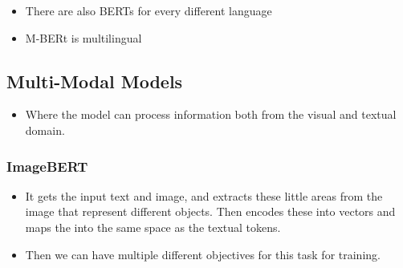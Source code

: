 \documentclass[11pt]{article}
\begin{document}
\begin{minipage}[l]{.5\linewidth}
    \begin{figure}[H]
        \centering
    \end{figure}    
\end{minipage}\hfill
\begin{minipage}[r]{.48\linewidth}
    \begin{itemize}
        \item There are also BERTs for every different language
        \item M-BERt is multilingual
    \end{itemize}
\end{minipage}

\subsection{Multi-Modal Models}

\begin{minipage}[l]{.5\linewidth}
    \begin{figure}[H]
        \centering
    \end{figure}    
\end{minipage}\hfill
\begin{minipage}[r]{.48\linewidth}
    \begin{itemize}
        \item Where the model can process information both from the visual and textual domain.
    \end{itemize}
\end{minipage}

\subsubsection{ImageBERT}

\begin{minipage}[l]{.5\linewidth}
    \begin{figure}[H]
        \centering
    \end{figure}    
\end{minipage}\hfill
\begin{minipage}[r]{.48\linewidth}
    \begin{itemize}
        \item It gets the input text and image, and extracts these little areas from the image that represent different objects. Then encodes these into vectors and maps the into the same space as the textual tokens.
        \item Then we can have multiple different objectives for this task for training.
    \end{itemize}
\end{minipage}
\end{document}
